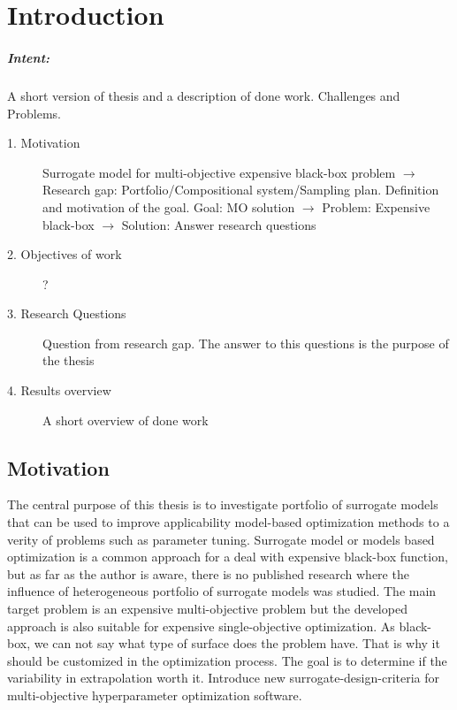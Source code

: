 \chapter{Introduction}\label{sec:intro}

\begin{blockquote}
\paragraph{Intent:} A short version of thesis and a description of done work. Challenges and Problems.

    \begin{description}
        \item[1. Motivation] Surrogate model for multi-objective expensive black-box problem $\rightarrow$ Research gap: Portfolio/Compositional system/Sampling plan. Definition and motivation of the goal. Goal: MO solution $\rightarrow$ Problem: Expensive black-box $\rightarrow$ Solution: Answer research questions
        \item[2. Objectives of work] ?
        \item[3. Research Questions] Question from research gap. The answer to this questions is the purpose of the thesis
        \item[4. Results overview] A short overview of done work
    \end{description}
\end{blockquote}

\section{Motivation}

    The central purpose of this thesis is to investigate portfolio of surrogate models that can be used to improve applicability model-based optimization methods to a verity of problems such as parameter tuning. Surrogate model or models based optimization is a common approach for a deal with expensive black-box function, but as far as the author is aware, there is no published research where the influence of heterogeneous portfolio of surrogate models was studied. The main target problem is an expensive multi-objective problem but the developed approach is also suitable for expensive single-objective optimization.
    As black-box, we can not say what type of surface does the problem have. That is why it should be customized in the optimization process. The goal is to determine if the variability in extrapolation worth it. Introduce new surrogate-design-criteria for multi-objective hyperparameter optimization software.

